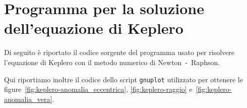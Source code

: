 \chapter{Programma per la soluzione dell'equazione di Keplero}
\label{cha:soluzione-keplero}

Di seguito è riportato il codice sorgente del programma usato per risolvere
l'equazione di Keplero con il metodo numerico di Newton~-~Raphson.
% 

Qui riportiamo inoltre il codice dello script \verb|gnuplot| utilizzato per
ottenere le figure~\ref{fig:keplero-anomalia_eccentrica},
\ref{fig:keplero-raggio} e~\ref{fig:keplero-anomalia_vera}.




